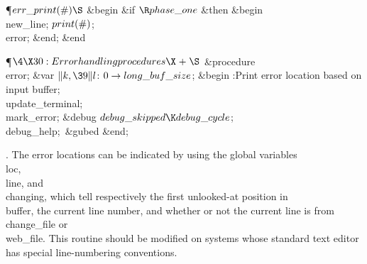 \Y\P\D {}$\\{err\_print}(\#)\S$\1\6
\&{begin} \&{if} $\R\\{phase\_one}$ \1\&{then}\6
\&{begin} \\{new\_line};\5
$\\{print}(\#)$;\5
\\{error};\6
\&{end};\2\6
\&{end}\2\par
\Y\P$\4\X30:Error handling procedures\X\mathrel{+}\S$\6
\4\&{procedure}\1\  \\{error};%
\6
\4\&{var} $\|k,\39\|l$: $0\to\\{long\_buf\_size}$;\2\6
\&{begin} :Print error location based on input buffer\X;\6
\\{update\_terminal};\5
\\{mark\_error};\6
\&{debug} $\\{debug\_skipped}\K\\{debug\_cycle}$;\5
\\{debug\_help};\ \&{gubed}\6
\&{end};\par
\fi

. The error locations can be indicated by using the global variables
\\{loc}, \\{line}, and \\{changing}, which tell respectively the first
unlooked-at position in \\{buffer}, the current line number, and whether or not
the current line is from \\{change\_file} or \\{web\_file}.
This routine should be modified on systems whose standard text editor
has special line-numbering conventions.

